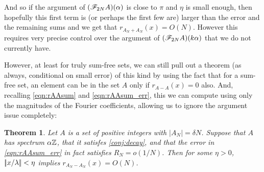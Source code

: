 \documentclass{article}
\newtheorem{theorem}{Theorem}[section]
\theoremstyle{definition}
\theoremstyle{remark}
\numberwithin{equation}{section}
\begin{document}
And so if the argument of $(\mathscr{F}_{2N}A)(\alpha)$ is close to $\pi$ and
$\eta$ is small enough, then hopefully this first term is (or perhaps
the first few are) larger than the error and the remaining sums and we
get that $r_{A_N + A_N}(x) = O(N)$.  However this requires very
precise control over the argument of $(\mathscr{F}_{2N}A)(k\alpha)$ that we
do not currently have.

However, at least for truly sum-free sets, we can still pull out a
theorem (as always, conditional on small error) of this kind by using
the fact that for a sum-free set, an element can be in the set $A$
only if $r_{A-A}(x) = 0$ also.  And, recalling \ref{eqn:rAAsum} and
\ref{eqn:rAAsum_err}, this we can compute using only the magnitudes of
the Fourier coefficients, allowing us to ignore the argument issue
completely: 

\begin{theorem}\label{thm:hole1}
  Let $A$ is a \relevant set of positive integers with
  $|A_N| = \delta N$.  Suppose that $A$ has spectrum $\alpha\mathbb{Z}$, that
  it satisfes \ref{conj:decay}, and that the error in
  \ref{eqn:rAAsum_err} in fact satisfies $R_N = o(1/N)$.  Then for
  some $\eta > 0$, $|\!|x/\lambda|\!| < \eta$ implies
  $r_{A_N-A_N}(x) = O(N)$.
\end{theorem}
\end{document}
